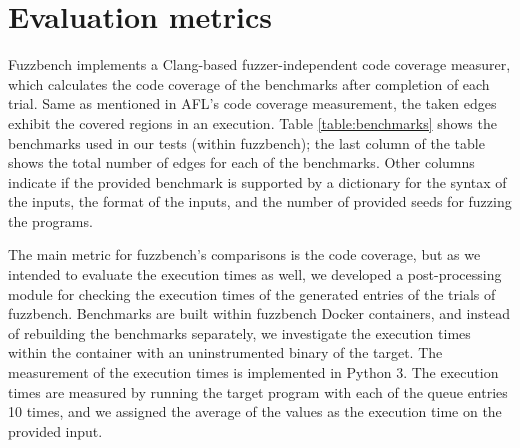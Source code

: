 \section{Evaluation metrics}
\label{sec:ch4-metrics}


Fuzzbench implements a Clang-based fuzzer-independent code coverage measurer, which calculates the code coverage of the benchmarks after completion of each trial. Same as mentioned in AFL's code coverage measurement, the taken edges exhibit the covered regions in an execution. Table \ref{table:benchmarks} shows the benchmarks used in our tests (within fuzzbench); the last column of the table shows the total number of edges for each of the benchmarks. Other columns indicate if the provided benchmark is supported by a dictionary for the syntax of the inputs, the format of the inputs, and the number of provided seeds for fuzzing the programs. 

\begin{table}[]
    \centering
    \caption{List of benchmarks used in evaluation}
    \label{table:benchmarks}
\end{table}


The main metric for fuzzbench's comparisons is the code coverage, but as we intended to evaluate the execution times as well, we developed a post-processing module for checking the execution times of the generated entries of the trials of fuzzbench. Benchmarks are built within fuzzbench Docker containers, and instead of rebuilding the benchmarks separately, we investigate the execution times within the container with an uninstrumented binary of the target. The measurement of the execution times is implemented in Python 3. The execution times are measured by running the target program with each of the queue entries 10 times, and we assigned the average of the values as the execution time on the provided input.
